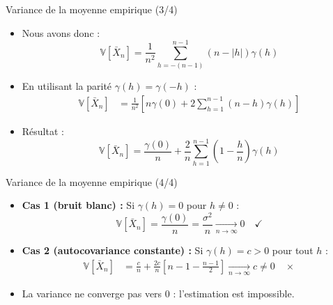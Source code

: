 \documentclass[11pt,aspectratio=169]{beamer}
\newcommand{\Var}{\mathbb{V}}
\begin{document}
\begin{frame}{Variance de la moyenne empirique (3/4)}

\begin{itemize}

\item Nous avons donc :
  \[
  \Var[\bar{X}_n] = \frac{1}{n^2} \sum_{h=-(n-1)}^{n-1} (n - |h|) \gamma(h)
  \]\newline

\item En utilisant la parité $\gamma(h) = \gamma(-h)$ :
  \begin{align*}
  \Var[\bar{X}_n] &= \frac{1}{n^2} \left[ n\gamma(0) + 2\sum_{h=1}^{n-1} (n-h) \gamma(h) \right]
  \end{align*}\newline

\item Résultat :
  \[
  \boxed{\Var[\bar{X}_n] = \frac{\gamma(0)}{n} + \frac{2}{n} \sum_{h=1}^{n-1} \left(1 - \frac{h}{n}\right) \gamma(h)}
  \]

\end{itemize}

\end{frame}

\begin{frame}{Variance de la moyenne empirique (4/4)}

\begin{itemize}

\item \textbf{Cas 1 (bruit blanc) :} Si $\gamma(h) = 0$ pour $h \neq 0$ :
  \[
  \Var[\bar{X}_n] = \frac{\gamma(0)}{n} = \frac{\sigma^2}{n} \xrightarrow[n \to \infty]{} 0 \quad \checkmark
  \]\newline

\item \textbf{Cas 2 (autocovariance constante) :} Si $\gamma(h) = c > 0$ pour tout $h$ :
  \begin{align*}
  \Var[\bar{X}_n] &= \frac{c}{n} + \frac{2c}{n} \left[ n - 1 - \frac{n-1}{2} \right] \xrightarrow[n \to \infty]{} c \neq 0 \quad \times
  \end{align*}\newline

\item La variance ne converge pas vers 0 : l'estimation est impossible.

\end{itemize}

\end{frame}
\end{document}
